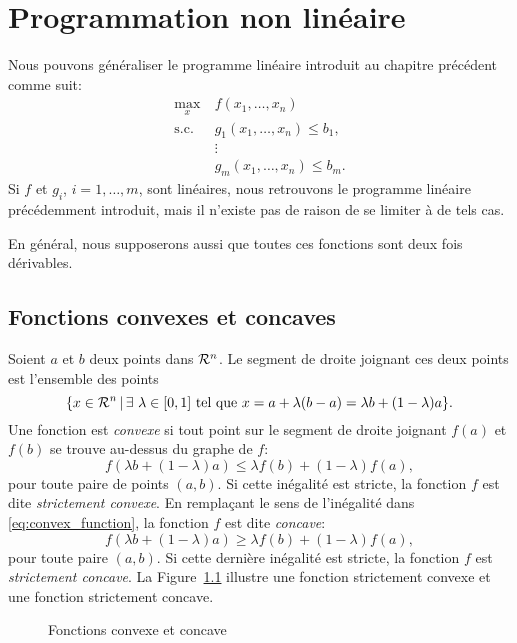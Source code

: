 \chapter{Programmation non linéaire}
\label{chap:nonlinear}

Nous pouvons généraliser le programme linéaire introduit au chapitre précédent comme suit:
\begin{align*}
\max_x\ & f(x_1,\ldots,x_n) \\
\text{s.c.} & g_1(x_1,\ldots,x_n) \leq b_1, \\
& \vdots \\
& g_m(x_1,\ldots,x_n) \leq b_m.
\end{align*}
Si $f$ et $g_i$, $i = 1,\ldots,m$, sont linéaires, nous retrouvons le programme linéaire précédemment introduit, mais il n'existe pas de raison de se limiter à de tels cas.

En général, nous supposerons aussi que toutes ces fonctions sont deux fois dérivables.

\section{Fonctions convexes et concaves}

Soient $a$ et $b$ deux points dans $\mathcal{R}^n$.
Le segment de droite joignant ces deux points est l'ensemble des points
\[
\lbrace x \in \mathcal{R}^n \,|\, \exists\ \lambda \in [0,1] \mbox{ tel que } x = a + \lambda (b-a) = \lambda b +(1-\lambda)a \rbrace.
\]
Une fonction est {\sl convexe} si tout point sur le segment de droite joignant $f(a)$ et $f(b)$ se trouve au-dessus du graphe de $f$:
\begin{equation}
f(\lambda b +(1-\lambda)a) \leq \lambda f(b) + (1-\lambda)f(a),
\label{eq:convex_function}
\end{equation}
pour toute paire de points $(a,b)$.
Si cette inégalité est stricte, la fonction $f$ est dite {\sl strictement convexe}.
En remplaçant le sens de l'inégalité dans \eqref{eq:convex_function}, la fonction $f$ est dite {\sl concave}:
\[
f(\lambda b +(1-\lambda)a) \geq \lambda f(b) + (1-\lambda)f(a),
\]
pour toute paire $(a,b)$.
Si cette dernière inégalité est stricte, la fonction $f$ est {\sl strictement concave}.
La Figure~\ref{fig:convexity} illustre une fonction strictement convexe et une fonction strictement concave.

\begin{figure}[htb]
\begin{center}
\end{center}
\caption{Fonctions convexe et concave}
\label{fig:convexity}
\end{figure}

